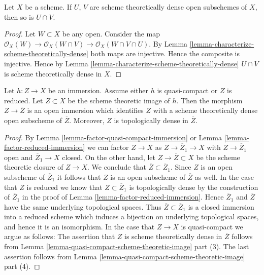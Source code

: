 \begin{lemma}
\label{lemma-intersection-scheme-theoretically-dense}
Let $X$ be a scheme. If $U$, $V$ are scheme theoretically dense
open subschemes of $X$, then so is $U \cap V$.
\end{lemma}

\begin{proof}
Let $W \subset X$ be any open.
Consider the map
$\mathcal{O}_X(W) \to \mathcal{O}_X(W \cap V)
\to \mathcal{O}_X(W \cap V \cap U)$.
By Lemma \ref{lemma-characterize-scheme-theoretically-dense}
both maps are injective. Hence the composite is injective.
Hence by Lemma \ref{lemma-characterize-scheme-theoretically-dense}
$U \cap V$ is scheme theoretically dense in $X$.
\end{proof}

\begin{lemma}
\label{lemma-quasi-compact-immersion}
Let $h : Z \to X$ be an immersion. Assume either $h$ is quasi-compact
or $Z$ is reduced. Let $\overline{Z} \subset X$ be the scheme theoretic
image of $h$. Then the morphism $Z \to \overline{Z}$ is an open immersion
which identifies $Z$ with a scheme theoretically dense open
subscheme of $\overline{Z}$. Moreover, $Z$ is topologically
dense in $\overline{Z}$.
\end{lemma}

\begin{proof}
By Lemma \ref{lemma-factor-quasi-compact-immersion} or
Lemma \ref{lemma-factor-reduced-immersion} we can factor
$Z \to X$ as $Z \to \overline{Z}_1 \to X$ with $Z \to \overline{Z}_1$
open and $\overline{Z}_1 \to X$ closed. On the other hand, let
$Z \to \overline{Z} \subset X$ be the scheme theoretic closure of
$Z \to X$. We conclude that $\overline{Z} \subset \overline{Z}_1$.
Since $Z$ is an open subscheme of $\overline{Z}_1$ it follows
that $Z$ is an open subscheme of $\overline{Z}$ as well.
In the case that $Z$ is reduced we know that $Z \subset \overline{Z}_1$
is topologically dense by the construction of $\overline{Z}_1$ in
the proof of Lemma \ref{lemma-factor-reduced-immersion}.
Hence $\overline{Z}_1$ and $\overline{Z}$ have the same
underlying topological spaces. Thus $\overline{Z} \subset \overline{Z}_1$
is a closed immersion into a reduced scheme which induces a bijection
on underlying topological spaces, and hence it is an isomorphism.
In the case that $Z \to X$ is quasi-compact we argue as follows:
The assertion that $Z$ is scheme theoretically dense in
$\overline{Z}$ follows from
Lemma \ref{lemma-quasi-compact-scheme-theoretic-image} part (3).
The last assertion follows from
Lemma \ref{lemma-quasi-compact-scheme-theoretic-image} part (4).
\end{proof}

